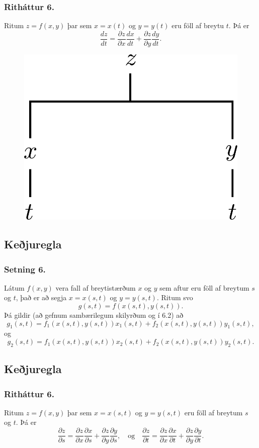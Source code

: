 \subsubsection{Ritháttur 6.}

Ritum $z=f(x,y)$ þar sem $x=x(t)$ og $y=y(t)$ eru föll af breytu $t$.  Þá er 
$$\frac{dz}{dt}=\frac{\partial z}{\partial x}\frac{dx}{dt}
+\frac{\partial z}{\partial y}\frac{dy}{dt}.$$

 \begin{figure}[h!]
           \centering
            \includegraphics[width=0.3\linewidth]{chain1}
    \end{figure}


\subsection{Keðjuregla} 

\subsubsection{Setning 6.}
 Látum $f(x,y)$ vera fall af breytistærðum $x$ og $y$ sem aftur eru föll af breytum $s$ og $t$, það er að segja 
$x=x(s,t)$ og $y=y(s,t)$.  Ritum svo 
$$g(s,t)=f(x(s,t),y(s,t)).$$
Þá gildir (að gefnum sambærilegum skilyrðum og í 6.2) að
$$g_1(s,t)=f_1(x(s,t),y(s,t))x_1(s,t)+f_2(x(s,t),y(s,t))y_1(s,t),$$
og 
$$g_2(s,t)=f_1(x(s,t),y(s,t))x_2(s,t)+f_2(x(s,t),y(s,t))y_2(s,t).$$




\subsection{Keðjuregla} 

\subsubsection{Ritháttur 6.}

Ritum $z=f(x,y)$ þar sem $x=x(s,t)$ og $y=y(s,t)$ eru föll af breytum $s$ og  $t$.  Þá er 
$$\frac{\partial z}{\partial s}=
\frac{\partial z}{\partial x}\frac{\partial x}{\partial s}
+\frac{\partial z}{\partial y}\frac{\partial y}{\partial s}, \quad \text{og}\quad \frac{\partial z}{\partial t}=
\frac{\partial z}{\partial x}\frac{\partial x}{\partial t}
+\frac{\partial z}{\partial y}\frac{\partial y}{\partial t}.$$

